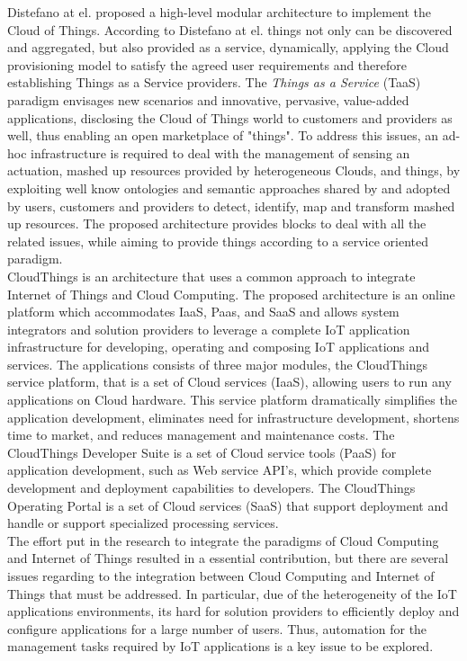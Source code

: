 Distefano \cite{distefano2012enabling} at el. proposed a high-level modular architecture to implement the Cloud of Things. According to Distefano at el. things
not only can be discovered and aggregated, but also provided as a service, dynamically, applying the Cloud provisioning model to satisfy the agreed
user requirements and therefore establishing Things as a Service providers. The \textit{Things as a Service} (TaaS) paradigm envisages new scenarios
and innovative, pervasive, value-added applications, disclosing the Cloud of Things world to customers and providers as well, thus enabling an open
marketplace of "things". To address this issues, an ad-hoc infrastructure is required to deal with the management of sensing an actuation, mashed up
resources provided by heterogeneous Clouds, and things, by exploiting well know ontologies and semantic approaches shared by and adopted by users,
customers and providers to detect, identify, map and transform mashed up resources. The proposed architecture provides blocks to deal with all the
related issues, while aiming to provide things according to a service oriented paradigm.\\

CloudThings \cite{zhou2013cloudthings} is an architecture that uses a common approach to integrate Internet of Things and Cloud Computing. The proposed architecture
is an online platform which accommodates IaaS, Paas, and SaaS and allows system integrators and solution providers to leverage a complete IoT application
infrastructure for developing, operating and composing IoT applications and services. The applications consists of three major modules, the CloudThings
service platform, that is a set of Cloud services (IaaS), allowing users to run any applications on Cloud hardware. This service platform dramatically
simplifies the application development, eliminates need for infrastructure development, shortens time to market, and reduces management and maintenance
costs. The CloudThings Developer Suite is a set of Cloud service tools (PaaS) for application development, such as Web service API's, which provide complete
development and deployment capabilities to developers. The CloudThings Operating Portal is a set of Cloud services (SaaS) that support deployment and handle
or support specialized processing services.\\

The effort put in the research to integrate the paradigms of Cloud Computing and Internet of Things resulted in a essential contribution, but there are several
issues regarding to the integration between Cloud Computing and Internet of Things that must be addressed. In particular, due of the heterogeneity of the IoT
applications environments, its hard for solution providers to efficiently deploy and configure applications for a large number of users. Thus, automation for
the management tasks required by IoT applications is a key issue to be explored.\\

